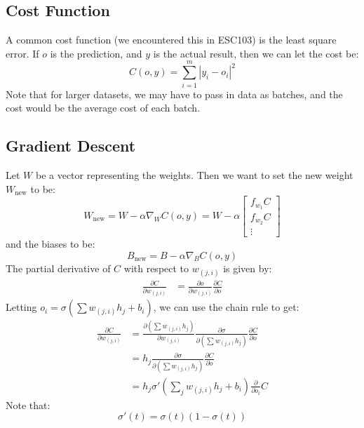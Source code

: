\documentclass{article}
\begin{document}
    \subsection{Cost Function}
    A common cost function (we encountered this in ESC103) is the least square error. If $o$ is the prediction, and $y$ is the actual result, then we can let the cost be:
    \begin{equation}
        C(o,y) = \sum_{i=1}^m \left|y_i - o_i \right|^2
    \end{equation}
    Note that for larger datasets, we may have to pass in data as batches, and the cost would be the average cost of each batch.
    \subsection{Gradient Descent}
    Let $W$ be a vector representing the weights. Then we want to set the new weight $W_\text{new}$ to be:
    \begin{equation}
        W_\text{new} = W - \alpha \nabla_W C(o,y) = W - \alpha \begin{bmatrix}
            f_{w_1}C \\ f_{w_2}C \\ \vdots 
        \end{bmatrix}
    \end{equation}
    and the biases to be:
    \begin{equation}
        B_\text{new} = B - \alpha \nabla_B C(o,y)
    \end{equation}
    The partial derivative of $C$ with respect to $w_{(j,i)}$ is given by:
    \begin{align}
        \frac{\partial C}{\partial w_{(j,i)}} &= \frac{\partial o}{\partial w_{(j,i)}} \frac{\partial C}{\partial o}
    \end{align}
    Letting $o_i = \sigma\left(\sum w_{(j,i)}h_j + b_i\right)$, we can use the chain rule to get:
    \begin{align}
        \frac{\partial C}{\partial w_{(j,i)}} &= \frac{\partial (\sum w_{(j,i)}h_j)}{\partial w_{(j,i)}}\frac{\partial \sigma}{\partial (\sum w_{(j,i)}h_j)}\frac{\partial C}{\partial o} \\ 
        &= h_j \frac{\partial \sigma}{\partial(\sum w_{(j,i)}h_j)}\frac{\partial C}{\partial o} \\ 
        &= h_j \sigma'\left(\sum_{j} w_{(j,i)}h_j + b_i\right) \frac{\partial}{\partial o_i}C
    \end{align}
    Note that:
    \begin{equation}
        \sigma'(t) = \sigma(t)(1-\sigma(t))
    \end{equation}
\end{document}
